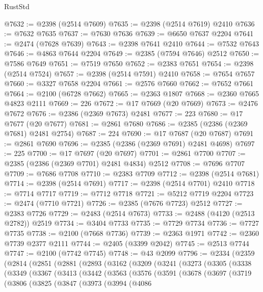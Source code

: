\begin{lexlean}{RustStd}
\begin{coremodule}
@7632 := @2398 (@2514 @7609)
@7635 := @2398 (@2514 @7619) @2410
@7636 := @7632 @7635
@7637 := @7630 @7636
@7639 := @6650 @7637 @2204
@7641 := @2474 (@7628 @7639)
@7643 := @2398 @7641 @2410
@7644 := @7532 @7643
@7646 := @4863 @7644 @2204
@7649 := @2385 (@7594 @7646) @2512
@7650 := @7586 @7649
@7651 := @7519 @7650
@7652 := @2383 @7651
@7654 := @2398 (@2514 @7524)
@7657 := @2398 (@2514 @7591) @2410
@7658 := @7654 @7657
@7660 := @3327 @7658 @2204
@7661 := @2576 @7660
@7662 := @7652 @7661
@7664 := @2100 (@6728 @7662)
@7665 := @2363 @1807
@7668 := @2360 @7665 @4823 @2111
@7669 := 226
@7672 := @17 @7669 (@20 @7669)
@7673 := @2476 @7672
@7676 := @2386 (@2369 @7673) @2481
@7677 := 223
@7680 := @17 @7677 (@20 @7677)
@7681 := @2861 @7680
@7686 := @2385 (@2386 (@2369 @7681) @2481 @2754)
@7687 := 224
@7690 := @17 @7687 (@20 @7687)
@7691 := @2861 @7690
@7696 := @2385 (@2386 (@2369 @7691) @2481 @4698)
@7697 := 225
@7700 := @17 @7697 (@20 @7697)
@7701 := @2861 @7700
@7707 := @2385 (@2386 (@2369 @7701) @2481 @4834) @2512
@7708 := @7696 @7707
@7709 := @7686 @7708
@7710 := @2383 @7709
@7712 := @2398 (@2514 @7681)
@7714 := @2398 (@2514 @7691)
@7717 := @2398 (@2514 @7701) @2410
@7718 := @7714 @7717
@7719 := @7712 @7718
@7721 := @5212 @7719 @2204
@7723 := @2474 (@7710 @7721)
@7726 := @2385 (@7676 @7723) @2512
@7727 := @2383 @7726
@7729 := @2483 (@2514 @7673)
@7733 := @2488 (@4120 (@2513 @2782)) @2519
@7734 := @3404 @7733
@7735 := @7729 @7734
@7736 := @7727 @7735
@7738 := @2100 (@7668 @7736)
@7739 := @2363 @1971
@7742 := @2360 @7739 @2377 @2111
@7744 := @2405 (@3399 @2042)
@7745 := @2513 @7744
@7747 := @2100 (@7742 @7745)
@7748 := @43 @2099
@7796 := @2334
    (@2359
      (@2814
        (@2851
          (@2881
            (@2893
              (@3162
                (@3209
                  (@3241
                    (@3273
                      (@3305
                        (@3338
                          (@3349
                            (@3367
                              (@3413
                                (@3442
                                  (@3563
                                    (@3576
                                      (@3591
                                        (@3678
                                          (@3697
                                            (@3719
                                              (@3806
                                                (@3825
                                                  (@3847
                                                    (@3973
                                                      (@3994
                                                        (@4086

\end{coremodule}
\end{lexlean}
